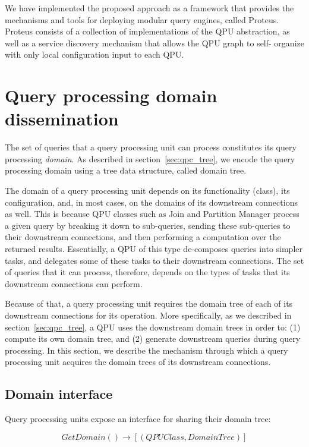 We have implemented the proposed approach as a framework that provides the mechanisms and tools for deploying modular query engines, called Proteus.
Proteus consists of a collection of implementations of the QPU abstraction, as well as a service discovery mechanism that allows the QPU graph to self- organize with only local configuration input to each QPU.


\section{Query processing domain dissemination}

The set of queries that a query processing unit can process constitutes its query processing \textit{domain}.
As described in section~\ref{sec:qpc_tree},
we encode the query processing domain using a tree data structure, called domain tree.

The domain of a query processing unit depends on its functionality (class), its configuration, and, in most cases,
on the domains of its downstream connections as well.
This is because QPU classes such as Join and Partition Manager process a given query by breaking it down to sub-queries,
sending these sub-queries to their downstream connections,
and then performing a computation over the returned results.
Essentially, a QPU of this type de-composes queries into simpler tasks, and delegates some of these tasks to their downstream connections.
The set of queries that it can process, therefore, depends on the types of tasks that its downstream connections can perform.

Because of that, a query processing unit requires the domain tree of each of its downstream connections for its operation.
More specifically, as we described in section~\ref{sec:qpc_tree}, a QPU uses the downstream domain trees in order to:
(1) compute its own domain tree, and (2) generate downstream queries during query processing.
In this section, we describe the mechanism through which a query processing unit acquires the domain trees
of its downstream connections.

\subsection{Domain interface}
Query processing units expose an interface for sharing their domain tree:

\begin{displaymath}
  GetDomain() \rightarrow [(QPUClass, DomainTree)]
\end{displaymath}

